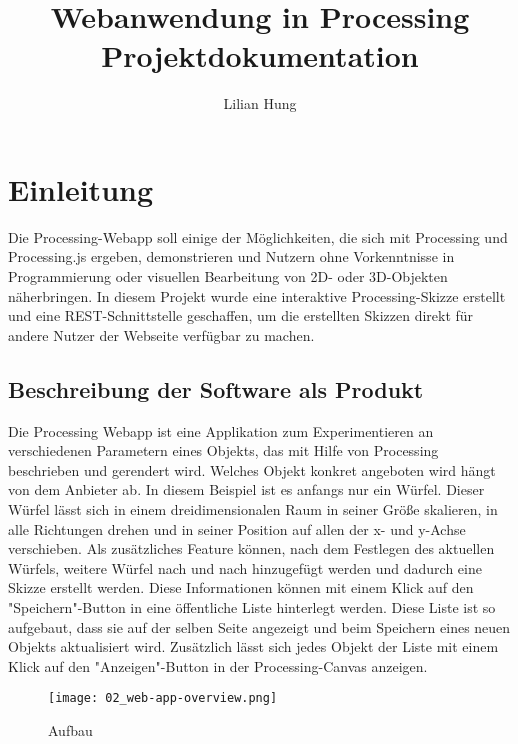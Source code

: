 \documentclass[12pt, ngerman, utf8]{article}
\begin{document}
\title{Webanwendung in Processing \\
		\large Projektdokumentation}
\author{Lilian Hung}

\maketitle

\newpage

\tableofcontents 

\lstlistoflistings

\newpage

\section{Einleitung}

Die Processing-Webapp soll einige der Möglichkeiten, die sich mit Processing und Processing.js ergeben, demonstrieren und Nutzern ohne Vorkenntnisse in Programmierung oder visuellen Bearbeitung von 2D- oder 3D-Objekten näherbringen.
In diesem Projekt wurde eine interaktive Processing-Skizze erstellt und eine REST-Schnittstelle geschaffen, um die erstellten Skizzen direkt für andere Nutzer der Webseite verfügbar zu machen.

\subsection{Beschreibung der Software als Produkt} 
Die Processing Webapp ist eine Applikation zum Experimentieren an verschiedenen Parametern eines Objekts, das mit Hilfe von Processing beschrieben und gerendert wird. 
Welches Objekt konkret angeboten wird hängt von dem Anbieter ab. In diesem Beispiel ist es anfangs nur ein Würfel. Dieser Würfel lässt sich in einem dreidimensionalen Raum in seiner Größe skalieren, in alle Richtungen drehen und in seiner Position auf allen der x- und y-Achse verschieben. 
Als zusätzliches Feature können, nach dem Festlegen des aktuellen Würfels, weitere Würfel nach und nach hinzugefügt werden und dadurch eine Skizze erstellt werden.
Diese Informationen können mit einem Klick auf den "Speichern"-Button in eine öffentliche Liste hinterlegt werden. Diese Liste ist so aufgebaut, dass sie auf der selben Seite angezeigt und beim Speichern eines neuen Objekts aktualisiert wird. Zusätzlich lässt sich jedes Objekt der Liste mit einem Klick auf den "Anzeigen"-Button in der Processing-Canvas anzeigen.\\
\begin{figure}[p]
    \centering
    \texttt{[image: 02\_web-app-overview.png]}
    \caption{Aufbau}
\end{figure}
\end{document}
